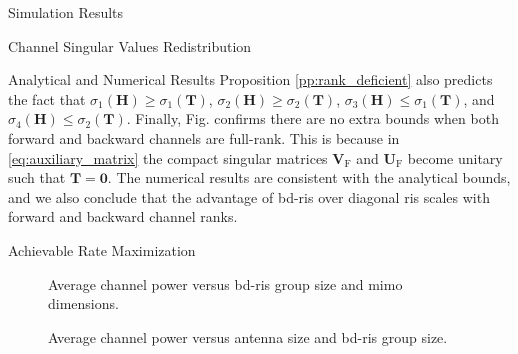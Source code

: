 \documentclass[journal]{IEEEtran}
\begin{document}
\begin{section}{Simulation Results}
\begin{subsection}{Channel Singular Values Redistribution}
\begin{subsubsection}{Analytical and Numerical Results}
			Proposition \ref{pp:rank_deficient} also predicts the fact that $\sigma_1(\mathbf{H}) \ge \sigma_1(\mathbf{T})$, $\sigma_2(\mathbf{H}) \ge \sigma_2(\mathbf{T})$, $\sigma_3(\mathbf{H}) \le \sigma_1(\mathbf{T})$, and $\sigma_4(\mathbf{H}) \le \sigma_2(\mathbf{T})$.
			Finally, Fig.  confirms there are no extra bounds when both forward and backward channels are full-rank.
			This is because in \eqref{eq:auxiliary_matrix} the compact singular matrices $\mathbf{V}_\mathrm{F}$ and $\mathbf{U}_\mathrm{F}$ become unitary such that $\mathbf{T}=\mathbf{0}$.
			The numerical results are consistent with the analytical bounds, and we also conclude that the advantage of \gls{bd}-\gls{ris} over diagonal \gls{ris} scales with forward and backward channel ranks.
		\end{subsubsection}

	\end{subsection}

	\begin{subsection}{Achievable Rate Maximization}
		\begin{figure}[!t]
			\centering
			\caption{
				Average channel power versus \gls{bd}-\gls{ris} group size and \gls{mimo} dimensions.
			}
			\label{fg:power_bond}
		\end{figure}

		\begin{figure}[!t]
			\centering
			\caption{
				Average channel power versus antenna size and \gls{bd}-\gls{ris} group size.
			}
			\label{fg:power_sx}
		\end{figure}


\end{subsection}
\end{section}
\end{document}
